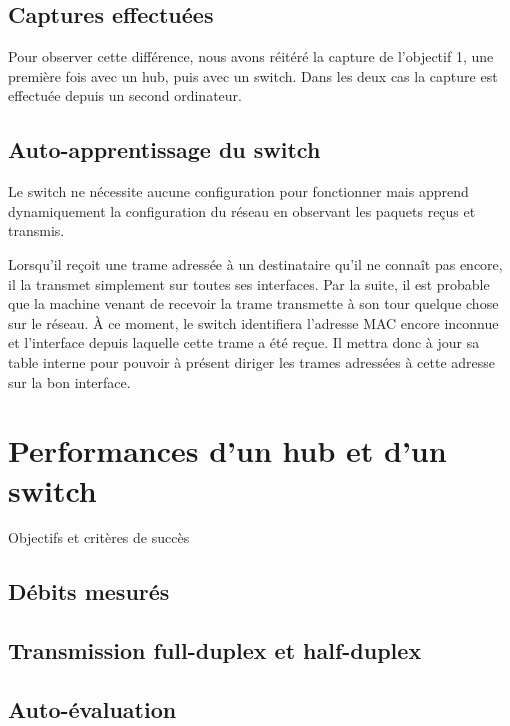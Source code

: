 \documentclass[11pt,a4paper]{article}
\begin{document}
\subsection{Captures effectuées}

Pour observer cette différence, nous avons réitéré la capture de l'objectif 1, une première fois avec un hub, puis avec un switch. Dans les deux cas la capture est effectuée depuis un second ordinateur.

\subsection{Auto-apprentissage du switch}

Le switch ne nécessite aucune configuration pour fonctionner mais apprend dynamiquement la configuration du réseau en observant les paquets reçus et transmis.

Lorsqu'il reçoit une trame adressée à un destinataire qu'il ne connaît pas encore, il la transmet simplement sur toutes ses interfaces. Par la suite, il est probable que la machine venant de recevoir la trame transmette à son tour quelque chose sur le réseau. À ce moment, le switch identifiera l'adresse MAC encore inconnue et l'interface depuis laquelle cette trame a été reçue. Il mettra donc à jour sa table interne pour pouvoir à présent diriger les trames adressées à cette adresse sur la bon interface.

\section{Performances d'un hub et d'un switch}

Objectifs et critères de succès

\subsection{Débits mesurés}

\subsection{Transmission full-duplex et half-duplex}

\subsection{Auto-évaluation}
\end{document}
